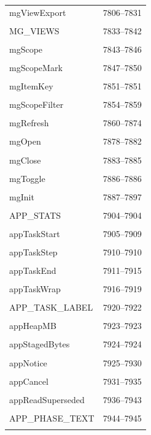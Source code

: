 {\begin{longtable}{@{}p{11cm}r@{}}
mgViewExport & 7806--7831 \\\\\hline
MG\_VIEWS & 7833--7842 \\\\\hline
mgScope & 7843--7846 \\\\\hline
mgScopeMark & 7847--7850 \\\\\hline
mgItemKey & 7851--7851 \\\\\hline
mgScopeFilter & 7854--7859 \\\\\hline
mgRefresh & 7860--7874 \\\\\hline
mgOpen & 7878--7882 \\\\\hline
mgClose & 7883--7885 \\\\\hline
mgToggle & 7886--7886 \\\\\hline
mgInit & 7887--7897 \\\\\hline
APP\_STATS & 7904--7904 \\\\\hline
appTaskStart & 7905--7909 \\\\\hline
appTaskStep & 7910--7910 \\\\\hline
appTaskEnd & 7911--7915 \\\\\hline
appTaskWrap & 7916--7919 \\\\\hline
APP\_TASK\_LABEL & 7920--7922 \\\\\hline
appHeapMB & 7923--7923 \\\\\hline
appStagedBytes & 7924--7924 \\\\\hline
appNotice & 7925--7930 \\\\\hline
appCancel & 7931--7935 \\\\\hline
appReadSuperseded & 7936--7943 \\\\\hline
APP\_PHASE\_TEXT & 7944--7945 \\\\\hline

\end{longtable}}

